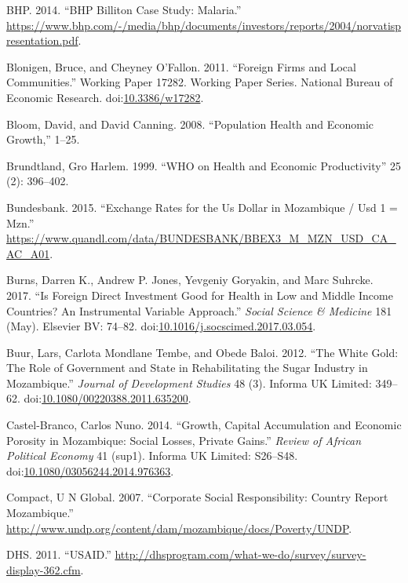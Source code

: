 \documentclass[]{article}
\begin{document}
\hypertarget{ref-bhp}{}
BHP. 2014. ``BHP Billiton Case Study: Malaria.''
\url{https://www.bhp.com/-/media/bhp/documents/investors/reports/2004/norvatispresentation.pdf}.

\hypertarget{ref-NBERw17282}{}
Blonigen, Bruce, and Cheyney O'Fallon. 2011. ``Foreign Firms and Local
Communities.'' Working Paper 17282. Working Paper Series. National
Bureau of Economic Research.
doi:\href{https://doi.org/10.3386/w17282}{10.3386/w17282}.

\hypertarget{ref-Bloom2008}{}
Bloom, David, and David Canning. 2008. ``Population Health and Economic
Growth,'' 1--25.

\hypertarget{ref-World1999}{}
Brundtland, Gro Harlem. 1999. ``WHO on Health and Economic
Productivity'' 25 (2): 396--402.

\hypertarget{ref-deutsche}{}
Bundesbank. 2015. ``Exchange Rates for the Us Dollar in Mozambique / Usd
1 = Mzn.''
\url{https://www.quandl.com/data/BUNDESBANK/BBEX3_M_MZN_USD_CA_AC_A01}.

\hypertarget{ref-Burns_2017}{}
Burns, Darren K., Andrew P. Jones, Yevgeniy Goryakin, and Marc Suhrcke.
2017. ``Is Foreign Direct Investment Good for Health in Low and Middle
Income Countries? An Instrumental Variable Approach.'' \emph{Social
Science \& Medicine} 181 (May). Elsevier BV: 74--82.
doi:\href{https://doi.org/10.1016/j.socscimed.2017.03.054}{10.1016/j.socscimed.2017.03.054}.

\hypertarget{ref-Buur2012}{}
Buur, Lars, Carlota Mondlane Tembe, and Obede Baloi. 2012. ``The White
Gold: The Role of Government and State in Rehabilitating the Sugar
Industry in Mozambique.'' \emph{Journal of Development Studies} 48 (3).
Informa UK Limited: 349--62.
doi:\href{https://doi.org/10.1080/00220388.2011.635200}{10.1080/00220388.2011.635200}.

\hypertarget{ref-CastelBranco2014}{}
Castel-Branco, Carlos Nuno. 2014. ``Growth, Capital Accumulation and
Economic Porosity in Mozambique: Social Losses, Private Gains.''
\emph{Review of African Political Economy} 41 (sup1). Informa UK
Limited: S26--S48.
doi:\href{https://doi.org/10.1080/03056244.2014.976363}{10.1080/03056244.2014.976363}.

\hypertarget{ref-Compact2007}{}
Compact, U N Global. 2007. ``Corporate Social Responsibility: Country
Report Mozambique.''
\url{http://www.undp.org/content/dam/mozambique/docs/Poverty/UNDP}.

\hypertarget{ref-dhs}{}
DHS. 2011. ``USAID.''
\url{http://dhsprogram.com/what-we-do/survey/survey-display-362.cfm}.
\end{document}
